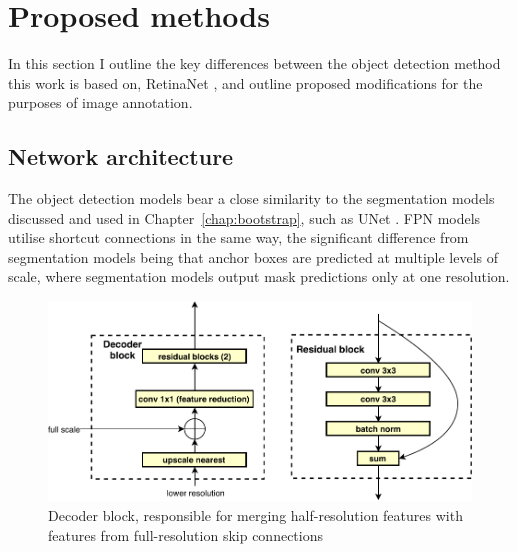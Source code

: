 \section{Proposed methods}
\label{sec:object_methods}

In this section I outline the key differences between the object detection method this work is based on, RetinaNet \cite{Lin2017}, and outline proposed modifications for the purposes of image annotation.

\subsection{Network architecture}

The object detection models bear a close similarity to the segmentation models discussed and used in Chapter~\ref{chap:bootstrap}, such as UNet \cite{Ronneberger2015}. \gls{FPN} models utilise shortcut connections in the same way, the significant difference from segmentation models being that anchor boxes are predicted at multiple levels of scale, where segmentation models output mask predictions only at one resolution.


\begin{figure}[htb!]
  \centering
  \includegraphics[width=1.0\linewidth]{figures/annotation/decoder_block.pdf}
  \caption{Decoder block, responsible for merging half-resolution features with features from full-resolution skip connections }  
  \label{fig:decoder_block}
\end{figure}


